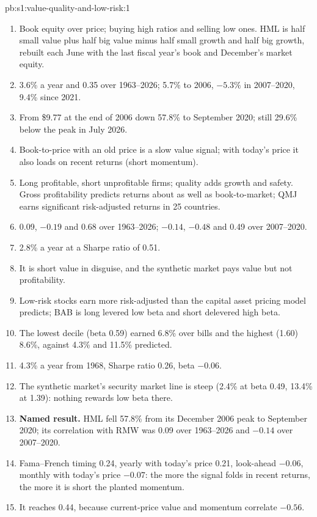 \begin{solution}{pb:s1:value-quality-and-low-risk:1}
\begin{enumerate}
\item Book equity over price; buying high ratios and selling low ones. HML is half small value plus half big value minus half small growth and half big growth,
rebuilt each June with the last fiscal year's book and December's market equity.
\item 3.6\% a year and 0.35 over 1963--2026; 5.7\% to 2006, $-5.3\%$ in 2007--2020, 9.4\% since 2021.
\item From \$9.77 at the end of 2006 down 57.8\% to September 2020; still 29.6\% below the peak in July 2026.
\item Book-to-price with an old price is a slow value signal; with today's price it also loads on recent returns (short momentum).
\item Long profitable, short unprofitable firms; quality adds growth and safety. Gross profitability predicts returns about as well as book-to-market; QMJ
earns significant risk-adjusted returns in 25 countries.
\item 0.09, $-0.19$ and 0.68 over 1963--2026; $-0.14$, $-0.48$ and 0.49 over 2007--2020.
\item 2.8\% a year at a Sharpe ratio of 0.51.
\item It is short value in disguise, and the synthetic market pays value but not profitability.
\item Low-risk stocks earn more risk-adjusted than the capital asset pricing model predicts; BAB is long levered low beta and short delevered high beta.
\item The lowest decile (beta 0.59) earned 6.8\% over bills and the highest (1.60) 8.6\%, against 4.3\% and 11.5\% predicted.
\item 4.3\% a year from 1968, Sharpe ratio 0.26, beta $-0.06$.
\item The synthetic market's security market line is steep (2.4\% at beta 0.49, 13.4\% at 1.39): nothing rewards low beta there.
\item \textbf{Named result.} HML fell 57.8\% from its December 2006 peak to September 2020; its correlation with RMW was 0.09 over 1963--2026 and $-0.14$ over
2007--2020.
\item Fama--French timing 0.24, yearly with today's price 0.21, look-ahead $-0.06$, monthly with today's price $-0.07$: the more the signal folds in recent
returns, the more it is short the planted momentum.
\item It reaches 0.44, because current-price value and momentum correlate $-0.56$.

\end{enumerate}
\end{solution}
